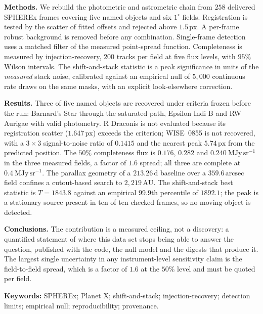 \documentclass[11pt,a4paper]{article}
\newcommand{\unit}[1]{\,\mathrm{#1}}
\newcommand{\mjysr}{\ \mathrm{MJy\,sr^{-1}}}
\newcommand{\arcsec}{\unit{arcsec}}
\newcommand{\au}{\unit{AU}}
\newcommand{\px}{\unit{px}}
\begin{document}
\medskip
\noindent\textbf{Methods.} We rebuild the photometric and astrometric chain from
$258$ delivered SPHEREx frames covering five named objects and six
$1^{\circ}$ fields. Registration is tested by the scatter of fitted offsets and
rejected above $1.5\px$. A per-frame robust background is removed before any
combination. Single-frame detection uses a matched filter of the measured
point-spread function. Completeness is measured by injection-recovery, $200$
tracks per field at five flux levels, with $95\%$ Wilson intervals. The
shift-and-stack statistic is a peak significance in units of the \emph{measured}
stack noise, calibrated against an empirical null of $5{,}000$ continuous rate
draws on the same masks, with an explicit look-elsewhere correction.

\medskip
\noindent\textbf{Results.} Three of five named objects are recovered under
criteria frozen before the run: Barnard's Star through the saturated path,
Epsilon Indi B and RW Aurigae with valid photometry. R Draconis is not evaluated
because its registration scatter ($1.647\px$) exceeds the criterion; WISE~0855 is
not recovered, with a $3\times3$ signal-to-noise ratio of $0.1415$ and the nearest
peak $5.74\px$ from the predicted position. The $50\%$ completeness flux is
$0.176$, $0.282$ and $0.240\mjysr$ in the three measured fields, a factor of
$1.6$ spread; all three are complete at $0.4\mjysr$. The parallax geometry of a
$213.26\unit{d}$ baseline over a $359.6\arcsec$ field confines a cutout-based
search to $2{,}219\au$. The shift-and-stack best statistic is $T=1843.8$ against
an empirical $99.9$th percentile of $1892.1$; the peak is a stationary source
present in ten of ten checked frames, so no moving object is detected.

\medskip
\noindent\textbf{Conclusions.} The contribution is a measured ceiling, not a
discovery: a quantified statement of where this data set stops being able to
answer the question, published with the code, the null model and the digests that
produce it. The largest single uncertainty in any instrument-level sensitivity
claim is the field-to-field spread, which is a factor of $1.6$ at the $50\%$
level and must be quoted per field.

\medskip
\noindent\textbf{Keywords:} SPHEREx; Planet X; shift-and-stack; injection-recovery;
detection limits; empirical null; reproducibility; provenance.

\newpage
\setcounter{tocdepth}{2}
{\small
\tableofcontents
}
\newpage

\end{document}
